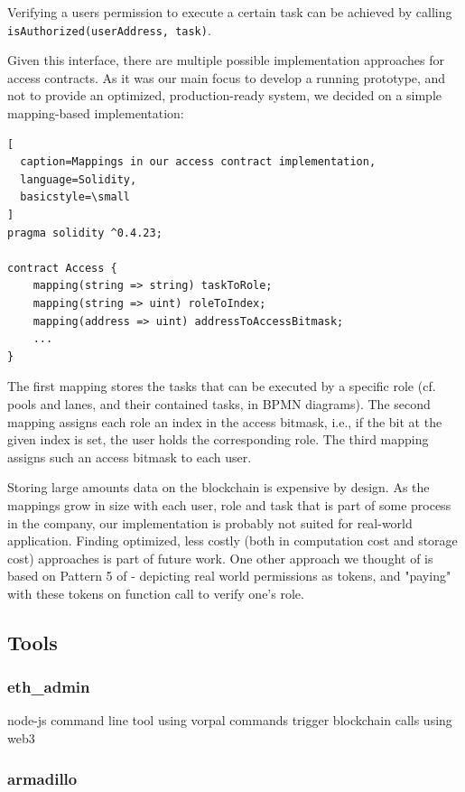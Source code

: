 \documentclass[runningheads]{llncs}
\begin{document}
Verifying a users permission to execute a certain task can be achieved by calling \texttt{isAuthorized(userAddress, task)}.
\newline

Given this interface, there are multiple possible implementation approaches for access contracts.
As it was our main focus to develop a running prototype, and not to provide an optimized, production-ready system, we decided on a simple mapping-based implementation:
\begin{lstlisting}[
  caption=Mappings in our access contract implementation,
  language=Solidity,
  basicstyle=\small
]
pragma solidity ^0.4.23;

contract Access {
    mapping(string => string) taskToRole;
    mapping(string => uint) roleToIndex;
    mapping(address => uint) addressToAccessBitmask;
    ...
}
\end{lstlisting}
The first mapping stores the tasks that can be executed by a specific role (cf. pools and lanes, and their contained tasks, in BPMN diagrams).
The second mapping assigns each role an index in the access bitmask, i.e., if the bit at the given index is set, the user holds the corresponding role.
The third mapping assigns such an access bitmask to each user.

Storing large amounts data on the blockchain is expensive by design.
As the mappings grow in size with each user, role and task that is part of some process in the company, our implementation is probably not suited for real-world application.
Finding optimized, less costly (both in computation cost and storage cost) approaches is part of future work.
One other approach we thought of is based on Pattern 5 of \cite{xu2018pattern} - depicting real world permissions as tokens, and "paying" with these tokens on function call to verify one's role.

\subsection{Tools}

\subsubsection{eth\_admin}

node-js command line tool using vorpal
commands trigger blockchain calls using web3

\subsubsection{armadillo}
\end{document}
